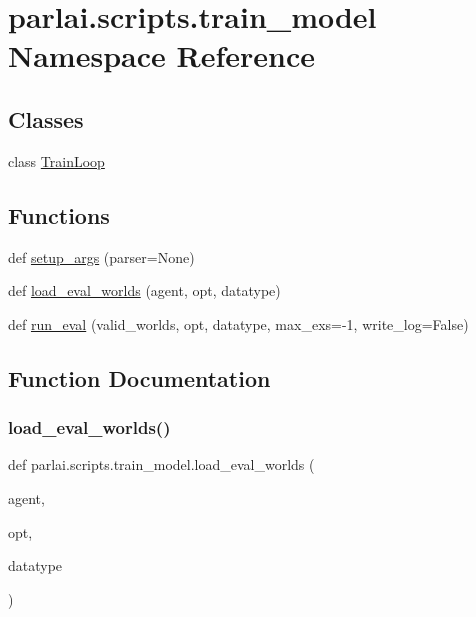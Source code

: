 \hypertarget{namespaceparlai_1_1scripts_1_1train__model}{}\section{parlai.\+scripts.\+train\+\_\+model Namespace Reference}
\label{namespaceparlai_1_1scripts_1_1train__model}
\subsection*{Classes}
\begin{DoxyCompactItemize}
\item 
class \hyperlink{classparlai_1_1scripts_1_1train__model_1_1TrainLoop}{Train\+Loop}
\end{DoxyCompactItemize}
\subsection*{Functions}
\begin{DoxyCompactItemize}
\item 
def \hyperlink{namespaceparlai_1_1scripts_1_1train__model_a5130cce2fb2a33694a2537d800ad9e9e}{setup\+\_\+args} (parser=None)
\item 
def \hyperlink{namespaceparlai_1_1scripts_1_1train__model_a70da71a6f4f9ad144666e6353d9278e3}{load\+\_\+eval\+\_\+worlds} (agent, opt, datatype)
\item 
def \hyperlink{namespaceparlai_1_1scripts_1_1train__model_a496dfe3bf04da9b55d261b4c8d6229a7}{run\+\_\+eval} (valid\+\_\+worlds, opt, datatype, max\+\_\+exs=-\/1, write\+\_\+log=False)
\end{DoxyCompactItemize}


\subsection{Function Documentation}
\mbox{\label{namespaceparlai_1_1scripts_1_1train__model_a70da71a6f4f9ad144666e6353d9278e3}} 
\subsubsection{\texorpdfstring{load\+\_\+eval\+\_\+worlds()}{load\_eval\_worlds()}}
{\footnotesize\ttfamily def parlai.\+scripts.\+train\+\_\+model.\+load\+\_\+eval\+\_\+worlds (\begin{DoxyParamCaption}\item[{}]{agent,  }\item[{}]{opt,  }\item[{}]{datatype }\end{DoxyParamCaption})}

